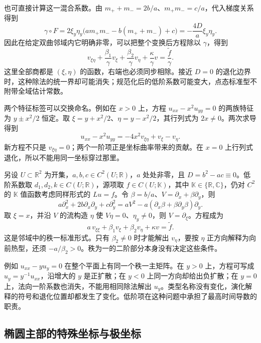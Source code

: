 也可直接计算这一混合系数。由 \(m_++m_-=2b/a\)、\(m_+m_-=c/a\)，代入梯度关系得到
\[
 \gamma\circ F=2\xi_y\eta_y\bigl(am_+m_--b(m_++m_-)+c\bigr)
 =-\frac{4D}{a}\xi_y\eta_y.
\]
因此在给定双曲邻域内它明确非零，可以把整个变换后方程除以 \(\gamma\)，得到
\[
 v_{\xi\eta}+\frac{\beta_1}{\gamma}v_\xi
 +\frac{\beta_2}{\gamma}v_\eta+\frac{\kappa}{\gamma}v
 =\frac{\widetilde f}{\gamma}.
\]
这里全部商都是 \((\xi,\eta)\) 的函数，右端也必须同步相除。接近 \(D=0\) 的退化边界时，这种除法的统一界却可能消失；规范化后的低阶系数可能变大，点态标准型不附带全域估计常数。

两个特征标签可以交换命名。例如在 \(x>0\) 上，方程 \(u_{xx}-x^2u_{yy}=0\) 的两族特征为 \(y\pm x^2/2\) 恒定。取 \(\xi=y+x^2/2\)、\(\eta=y-x^2/2\)，其行列式为 \(2x\ne0\)。两次求导得到
\[
 u_{xx}-x^2u_{yy}=-4x^2v_{\xi\eta}+v_\xi-v_\eta.
\]
新方程不只是 \(v_{\xi\eta}=0\)；两个一阶项正是坐标曲率带来的贡献。在 \(x=0\) 上行列式退化，所以不能用同一坐标穿过那里。

\ProseParagraphBreak

另设 \(U\subset\mathbb R^2\) 为开集，\(a,b,c\in C^2(U;\mathbb R)\)，\(a\) 处处非零，且 \(D=b^2-ac\equiv0\)。低阶系数取 \(d_1,d_2,k\in C(U;\mathbb R)\)，源项取 \(f\in C(U;\mathbb K)\)，其中 \(\mathbb K\in\{\mathbb R,\mathbb C\}\)，仍对 \(C^2\) 的 \(\mathbb K\) 值函数考虑同样形式的 \(Lu=f\)。令 \(\beta=b/a\)、\(V=\partial_x+\beta\partial_y\)，则
\[
 a\partial_x^2+2b\partial_x\partial_y+c\partial_y^2
 =aV^2-a(\partial_x\beta+\beta\partial_y\beta)\partial_y.
\]
取 \(\xi=x\)，并沿 \(V\) 的流构造 \(\eta\) 使 \(V\eta=0\)、\(\eta_y\ne0\)，则 \(V=\partial_\xi\)。方程成为
\[
 a\,v_{\xi\xi}+\beta_1v_\xi+\beta_2v_\eta+\kappa v=\widetilde f.
\]
这是邻域中的秩一标准形式。只有 \(\beta_2\ne0\) 时才能解出 \(v_\eta\)，要按 \(\eta\) 正方向解释为向前热型，还须 \(-a/\beta_2>0\)。秩为一的二阶部分本身没有决定这些条件。

\ProseParagraphBreak

例如 \(u_{xx}-yu_y=0\) 在整个平面上有同一个秩一主矩阵。在 \(y>0\) 上，方程可写成 \(u_y=y^{-1}u_{xx}\)，沿增大的 \(y\) 是正扩散；在 \(y<0\) 上同一方向却给出负扩散；在 \(y=0\) 上，法向一阶系数也消失，不能用相同除法解出 \(u_y\)。类型名称没有变化，演化解释的符号和退化位置却都发生了变化。低阶项在这种问题中承担了最高时间导数的职责。

\subsection{椭圆主部的特殊坐标与极坐标}
\label{b2:subsec:08-elliptic-polar-coordinates}

